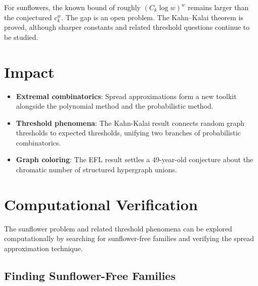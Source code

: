 For sunflowers, the known bound of roughly $(C_k\log w)^w$ remains larger than the conjectured $c_k^w$. The gap is an open problem. The Kahn--Kalai theorem is proved, although sharper constants and related threshold questions continue to be studied.

\section{Impact}
\begin{itemize}
\item \textbf{Extremal combinatorics}: Spread approximations form a new toolkit alongside the polynomial method and the probabilistic method.
\item \textbf{Threshold phenomena}: The Kahn-Kalai result connects random graph thresholds to expected thresholds, unifying two branches of probabilistic combinatorics.
\item \textbf{Graph coloring}: The EFL result settles a 49-year-old conjecture about the chromatic number of structured hypergraph unions.
\end{itemize}

\section{Computational Verification}

The sunflower problem and related threshold phenomena can be explored computationally by searching for sunflower-free families and verifying the spread approximation technique.

\subsection{Finding Sunflower-Free Families}

